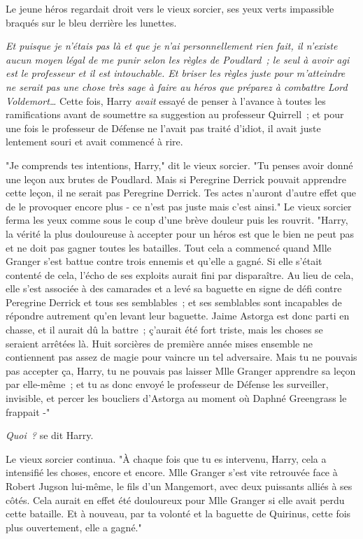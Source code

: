 Le jeune héros regardait droit vers le vieux sorcier, ses yeux verts impassible braqués sur le bleu derrière les lunettes.

\emph{Et puisque je n'étais pas là et que je n'ai personnellement rien fait, il n'existe aucun moyen légal de me punir selon les règles de Poudlard~; le seul à avoir agi est le professeur et il est intouchable. Et briser les règles juste pour m'atteindre ne serait pas une chose très sage à faire au héros que préparez à combattre Lord Voldemort…} Cette fois, Harry \emph{avait} essayé de penser à l'avance à toutes les ramifications avant de soumettre sa suggestion au professeur Quirrell~; et pour une fois le professeur de Défense ne l'avait pas traité d'idiot, il avait juste lentement souri et avait commencé à rire.

"Je comprends tes intentions, Harry," dit le vieux sorcier. "Tu penses avoir donné une leçon aux brutes de Poudlard. Mais si Peregrine Derrick pouvait apprendre cette leçon, il ne serait pas Peregrine Derrick. Tes actes n'auront d'autre effet que de le provoquer encore plus - ce n'est pas juste mais c'est ainsi." Le vieux sorcier ferma les yeux comme sous le coup d'une brève douleur puis les rouvrit. "Harry, la vérité la plus douloureuse à accepter pour un héros est que le bien ne peut pas et ne doit pas gagner toutes les batailles. Tout cela a commencé quand Mlle Granger s'est battue contre trois ennemis et qu'elle a gagné. Si elle s'était contenté de cela, l'écho de ses exploits aurait fini par disparaître. Au lieu de cela, elle s'est associée à des camarades et a levé sa baguette en signe de défi contre Peregrine Derrick et tous ses semblables~; et ses semblables sont incapables de répondre autrement qu'en levant leur baguette. Jaime Astorga est donc parti en chasse, et il aurait dû la battre~; ç'aurait été fort triste, mais les choses se seraient arrêtées là. Huit sorcières de première année mises ensemble ne contiennent pas assez de magie pour vaincre un tel adversaire. Mais tu ne pouvais pas accepter ça, Harry, tu ne pouvais pas laisser Mlle Granger apprendre sa leçon par elle-même~; et tu as donc envoyé le professeur de Défense les surveiller, invisible, et percer les boucliers d'Astorga au moment où Daphné Greengrass le frappait -"

\emph{Quoi~?} se dit Harry.

Le vieux sorcier continua. "À chaque fois que tu es intervenu, Harry, cela a intensifié les choses, encore et encore. Mlle Granger s'est vite retrouvée face à Robert Jugson lui-même, le fils d'un Mangemort, avec deux puissants alliés à ses côtés. Cela aurait en effet été douloureux pour Mlle Granger si elle avait perdu cette bataille. Et à nouveau, par ta volonté et la baguette de Quirinus, cette fois plus ouvertement, elle a gagné."

